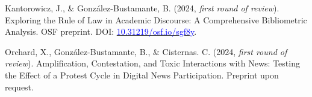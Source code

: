 \begin{publications}
\begin{benumerate}{9}
\item{Kantorowicz, J., \& González-Bustamante, B. (2024, {\itshape first round of review}). Exploring the Rule of Law in Academic Discourse: A Comprehensive Bibliometric Analysis. OSF preprint. DOI: \href{https://doi.org/10.31219/osf.io/sgf8y}{\textcolor{blue}{10.31219/osf.io/sgf8y}}.}\vspace{1mm}

\item{Orchard, X., González-Bustamante, B., \& Cisternas. C. (2024, {\itshape first round of review}). Amplification, Contestation, and Toxic Interactions with News: Testing the Effect of a Protest Cycle in Digital News Participation. Preprint upon request.}\vspace{1mm}

\end{benumerate}

\end{publications}

